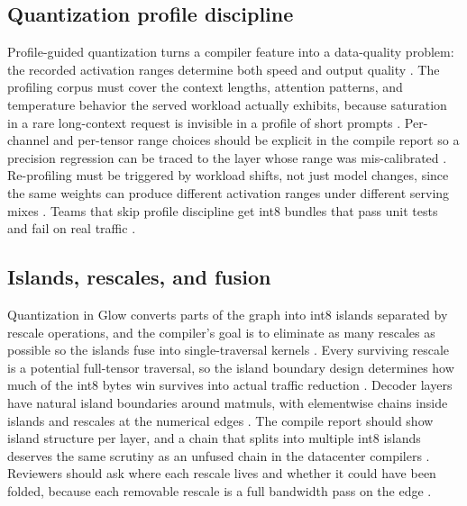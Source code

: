 \subsection{Quantization profile discipline}

Profile-guided quantization turns a compiler feature into a data-quality problem: the recorded activation ranges determine both speed and output quality \citep{rotem2018glow,patel2025llminference}. The profiling corpus must cover the context lengths, attention patterns, and temperature behavior the served workload actually exhibits, because saturation in a rare long-context request is invisible in a profile of short prompts \citep{kwon2023vllm,dao2022flashattention}. Per-channel and per-tensor range choices should be explicit in the compile report so a precision regression can be traced to the layer whose range was mis-calibrated \citep{chen2020compilerbasedhardw,patel2025llminference}. Re-profiling must be triggered by workload shifts, not just model changes, since the same weights can produce different activation ranges under different serving mixes \citep{memoryfloor2026,patel2025llminference}. Teams that skip profile discipline get int8 bundles that pass unit tests and fail on real traffic \citep{taxbreak2026,rotem2018glow}.

\subsection{Islands, rescales, and fusion}

Quantization in Glow converts parts of the graph into int8 islands separated by rescale operations, and the compiler's goal is to eliminate as many rescales as possible so the islands fuse into single-traversal kernels \citep{rotem2018glow,pytorchglow2024}. Every surviving rescale is a potential full-tensor traversal, so the island boundary design determines how much of the int8 bytes win survives into actual traffic reduction \citep{memoryfloor2026,taxbreak2026}. Decoder layers have natural island boundaries around matmuls, with elementwise chains inside islands and rescales at the numerical edges \citep{dao2022flashattention,patel2025llminference}. The compile report should show island structure per layer, and a chain that splits into multiple int8 islands deserves the same scrutiny as an unfused chain in the datacenter compilers \citep{rotem2018glow,chen2020compilerbasedhardw}. Reviewers should ask where each rescale lives and whether it could have been folded, because each removable rescale is a full bandwidth pass on the edge \citep{memoryfloor2026,patel2025llminference}.

